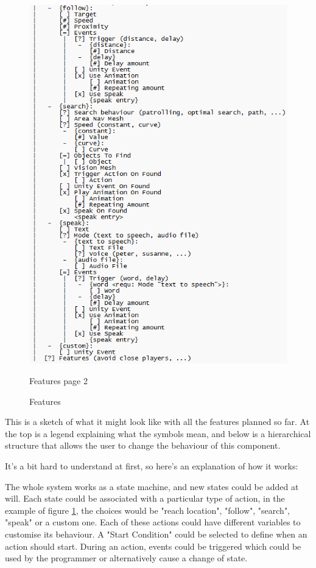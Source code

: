 \begin{figure}[H]
\begin{minipage}{0.45\textwidth}
    \includegraphics[scale=0.55]{images/bot_contoller_features_2.png}
    \caption{Features page 2}
    \label{fig:bot_contoller_features_2}
  \end{minipage}
  \caption{Features}
  \label{fig:bot_contoller_features}
\end{figure}

This is a sketch of what it might look like with all the features planned so far. At the top is a legend explaining what the symbols mean, and below is a hierarchical structure that allows the user to change the behaviour of this component.

It's a bit hard to understand at first, so here's an explanation of how it works:

The whole system works as a state machine, and new states could be added at will. Each state could be associated with a particular type of action, in the example of figure \ref{fig:bot_contoller_features}, the choices would be "reach location", "follow", "search", "speak" or a custom one. Each of these actions could have different variables to customise its behaviour. A "Start Condition" could be selected to define when an action should start. During an action, events could be triggered which could be used by the programmer or alternatively cause a change of state.

